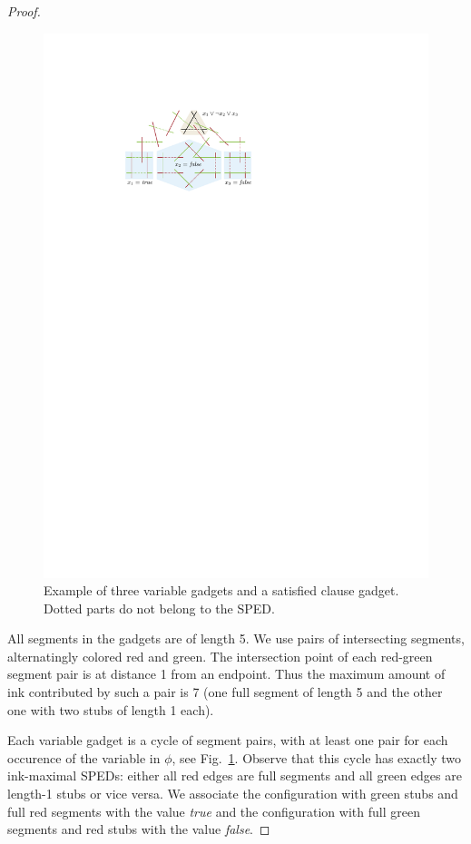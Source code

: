 \documentclass[a4paper,english,numberwithinsect]{eurocg18}
\begin{document}
\begin{proof}
\begin{figure}
			\centering
\includegraphics{Reduction_visual}
\caption{Example of three variable gadgets and a satisfied clause gadget. Dotted parts do not belong to the SPED.}
\label{fig:gadget_connection}
		\end{figure}
	All segments in the gadgets are of length 5.
	We use pairs of intersecting segments, alternatingly colored red and green.
	The intersection point of each red-green segment pair is at distance 1 from an endpoint.
	Thus the maximum amount of ink contributed by such a pair is 7 (one full segment of length 5 and the other one with two stubs of length 1 each).
	
	Each variable gadget is a cycle of segment pairs, with at least one pair for each occurence of the variable in $\phi$, see Fig.~\ref{fig:gadget_connection}. 
	Observe that this cycle has exactly two ink-maximal SPEDs: either all red edges are full segments and all green edges are length-1 stubs or vice versa.
	We associate the configuration with green stubs and full red segments with the value \emph{true} and the configuration with full green segments and red stubs with the value \emph{false}.
	

\end{proof}
\end{document}
